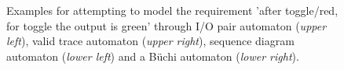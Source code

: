 \begin{figure}[!ht] 
	\centering
	\caption{Examples for attempting to model the requirement 'after toggle/red, for toggle the output is green' through I/O pair automaton (\textit{upper left}), valid trace automaton (\textit{upper right}), sequence diagram automaton (\textit{lower left}) and a Büchi automaton (\textit{lower right}).} 
	\label{fig_architecture_buchiexample}
\end{figure}

